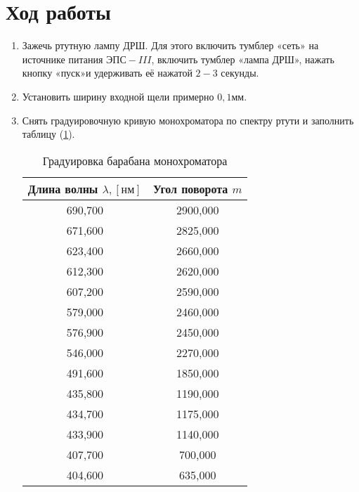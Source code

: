 \documentclass[12pt]{article}
\let\oldref\ref
\renewcommand{\ref}[1]{(\oldref{#1})}
\begin{document}
    \section*{Ход работы}
    \begin{enumerate}[wide, labelwidth=!, labelindent=0pt]
        \item Зажечь  ртутную  лампу  ДРШ.  Для  этого  включить  тумблер  «сеть»  на  источнике питания  $ ЭПС-III $,  включить  тумблер  «лампа  ДРШ», нажать  кнопку  «пуск»и  удерживать  её нажатой $ 2-3 $ секунды.
        \item Установить ширину  входной  щели  примерно  $ 0,1мм $.
        \item Снять градуировочную кривую монохроматора по спектру ртути и заполнить таблицу \ref{tab:1}.
        \begin{table}[h!]
            \caption{Градуировка барабана монохроматора}
            \label{tab:1}
            \centering
            \begin{tabular}{|c|c|}
                \hline
                Длина волны $\lambda, [нм]$ & Угол поворота $ m $  \\
                \hline                
                690,700 & 2900,000\\ 
 \hline 
671,600 & 2825,000\\ 
 \hline 
623,400 & 2660,000\\ 
 \hline 
612,300 & 2620,000\\ 
 \hline 
607,200 & 2590,000\\ 
 \hline 
579,000 & 2460,000\\ 
 \hline 
576,900 & 2450,000\\ 
 \hline 
546,000 & 2270,000\\ 
 \hline 
491,600 & 1850,000\\ 
 \hline 
435,800 & 1190,000\\ 
 \hline 
434,700 & 1175,000\\ 
 \hline 
433,900 & 1140,000\\ 
 \hline 
407,700 & 700,000\\ 
 \hline 
404,600 & 635,000\\ 
 \hline 
                

\end{tabular}
\end{table}
\end{enumerate}
\end{document}
